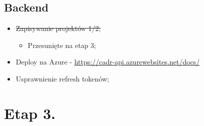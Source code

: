 \documentclass[11pt]{article}
\begin{document}
\subsection{Backend}
\label{sec:orge73d031}
\begin{itemize}
\item \sout{Zapisywanie projektów 1/2;}
\begin{itemize}
\item Przesunięte na etap 3;
\end{itemize}
\item Deploy na Azure -  \url{https://cadr-api.azurewebsites.net/docs/}
\item Usprawnienie refresh tokenów;
\end{itemize}
\section{Etap 3.}
\label{sec:orgcfb40e8}
\end{document}

